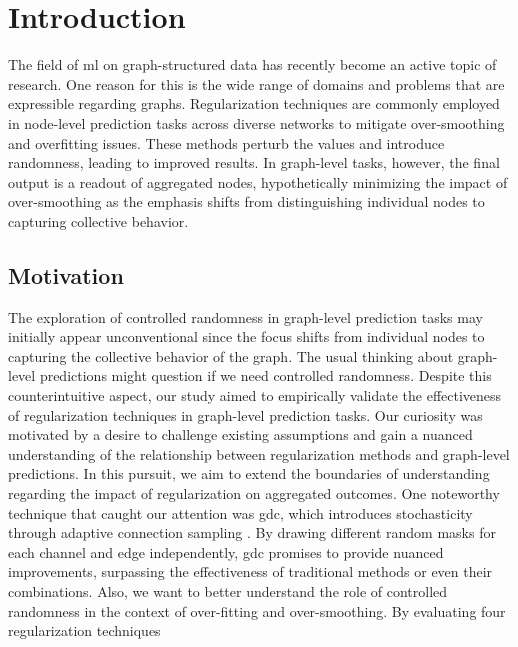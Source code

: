 \chapter{Introduction}%
\label{sec:intro}

\setcounter{page}{1}			%

The field of \acs{ml} on graph-structured data has recently become an active topic of research.
One reason for this is the wide range of domains and problems that are expressible regarding graphs.
Regularization techniques are commonly employed in node-level prediction tasks across diverse networks to mitigate over-smoothing and overfitting issues.
These methods perturb the values and introduce randomness, leading to improved results.
In graph-level tasks, however, the final output is a readout of aggregated nodes, hypothetically minimizing the impact of over-smoothing as the emphasis shifts from distinguishing individual nodes to capturing collective behavior.


\section{Motivation}%
\label{sec:intro:motivation}

The exploration of controlled randomness in graph-level prediction tasks may initially appear unconventional since the focus shifts from individual nodes to capturing the collective behavior of the graph.
The usual thinking about graph-level predictions might question if we need controlled randomness.
Despite this counterintuitive aspect, our study aimed to empirically validate the effectiveness of regularization techniques in graph-level prediction tasks.
Our curiosity was motivated by a desire to challenge existing assumptions and gain a nuanced understanding of the relationship between regularization methods and graph-level predictions.
In this pursuit, we aim to extend the boundaries of understanding regarding the impact of regularization on aggregated outcomes.
One noteworthy technique that caught our attention was \acf{gdc}, which introduces stochasticity through adaptive connection sampling \cite{Hasanzadeh2020}.
By drawing different random masks for each channel and edge independently, \ac{gdc} promises to provide nuanced improvements, surpassing the effectiveness of traditional methods or even their combinations.
Also, we want to better understand the role of controlled randomness in the context of over-fitting and over-smoothing.
By evaluating four regularization techniques

